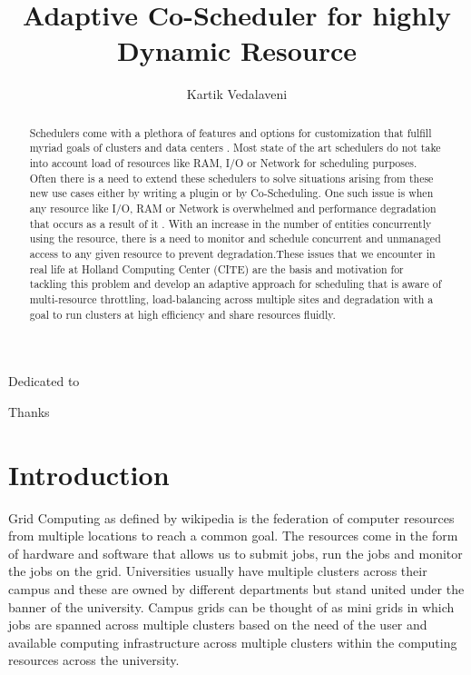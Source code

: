 \documentclass[ms,electronic,double]{nuthesis}
\begin{document}
\frontmatter
\title{Adaptive Co-Scheduler for highly Dynamic Resource}
\author{Kartik Vedalaveni}
\maketitle

\begin{abstract}
Schedulers come with a plethora of features and 
options for customization that fulfill myriad goals of  
clusters and data centers . Most state of the art schedulers do not take into account load of resources 
like RAM, I/O or Network for scheduling purposes. Often there is a need to extend these schedulers to solve 
situations arising from these new use cases either by writing a plugin or by Co-Scheduling. One such 
issue is when any resource like I/O, RAM or Network is
overwhelmed and performance degradation that occurs as a result of it . With an increase in the number 
of entities concurrently using the resource, there is a 
need to monitor and schedule concurrent and unmanaged access to any given resource to prevent 
degradation.These issues that we encounter in real life at Holland Computing Center (CITE) are the 
basis and motivation for tackling this problem and develop an adaptive approach for scheduling 
that is aware of multi-resource throttling, load-balancing across multiple sites and degradation 
with a goal to run clusters at high efficiency and share resources fluidly. 
\end{abstract}

\begin{dedication}
Dedicated to 
\end{dedication}

\begin{acknowledgments}
Thanks
\end{acknowledgments}

\tableofcontents
\newpage
\listoffigures
\listoftables


\mainmatter

\chapter{Introduction}
Grid Computing as defined by wikipedia is the federation of computer resources from multiple locations
to reach a common goal. The resources come in the form of hardware 
and software that allows us to submit jobs, run the jobs and monitor the jobs on the grid. 
Universities usually have multiple clusters across their campus and these are 
owned by different departments but stand united under the banner of the university.
Campus grids can be thought of as mini grids in which jobs are spanned across multiple clusters
 based on the need of the user and available computing infrastructure 
across multiple clusters within the computing resources across the university.
\end{document}
